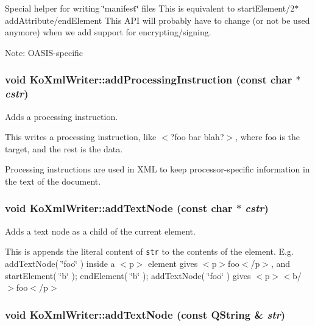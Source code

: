 Special helper for writing \char`\"{}manifest\char`\"{} files This is equivalent to startElement/2$\ast$addAttribute/endElement This API will probably have to change (or not be used anymore) when we add support for encrypting/signing. \begin{Desc}
\item[Note:]OASIS-specific \end{Desc}
\hypertarget{classKoXmlWriter_ded4a15ee74b3dbd14cd0965d1ee471f}{
\subsubsection[{addProcessingInstruction}]{\setlength{\rightskip}{0pt plus 5cm}void KoXmlWriter::addProcessingInstruction (const char $\ast$ {\em cstr})}}
\label{classKoXmlWriter_ded4a15ee74b3dbd14cd0965d1ee471f}


Adds a processing instruction. 

This writes a processing instruction, like $<$?foo bar blah?$>$, where foo is the target, and the rest is the data.

Processing instructions are used in XML to keep processor-specific information in the text of the document. \hypertarget{classKoXmlWriter_354008d8e086577751b2cbee5bf973f2}{
\subsubsection[{addTextNode}]{\setlength{\rightskip}{0pt plus 5cm}void KoXmlWriter::addTextNode (const char $\ast$ {\em cstr})}}
\label{classKoXmlWriter_354008d8e086577751b2cbee5bf973f2}


Adds a text node as a child of the current element. 

This is appends the literal content of {\tt str} to the contents of the element. E.g. addTextNode( \char`\"{}foo\char`\"{} ) inside a $<$p$>$ element gives $<$p$>$foo$<$/p$>$, and startElement( \char`\"{}b\char`\"{} ); endElement( \char`\"{}b\char`\"{} ); addTextNode( \char`\"{}foo\char`\"{} ) gives $<$p$>$$<$b/$>$foo$<$/p$>$ \hypertarget{classKoXmlWriter_abee3ed993fcc913c3466083627843fc}{
\subsubsection[{addTextNode}]{\setlength{\rightskip}{0pt plus 5cm}void KoXmlWriter::addTextNode (const QString \& {\em str})}}
\label{classKoXmlWriter_abee3ed993fcc913c3466083627843fc}


